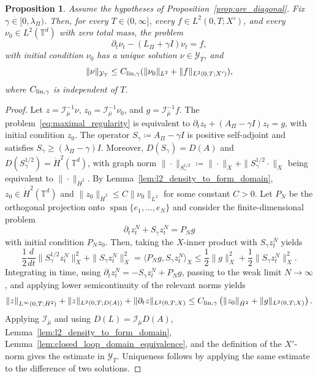 \documentclass[11pt]{article}
\numberwithin{equation}{section}
\newtheorem{proposition}[theorem]{Proposition}
\theoremstyle{definition}
\newcommand{\T}{\mathbb{T}}
\newcommand{\rieszmap}[1][\mu]{\mathcal{I}_{#1}}
\newcommand{\dotHk}[1][k]{\dot{H}^{#1}}
\begin{document}
\begin{proposition}
\label{prop:weighted_linear_density}
    Assume the hypotheses of Proposition~\ref{prop:are_diagonal}.
    Fix $\gamma \in [0, \lambda_\Pi)$. 
    Then, for every $T \in (0,\infty]$, every $f \in L^2(0,T; X')$, and every $\nu_0 \in L^2(\T^d)$ with zero total mass, the problem 
    \begin{equation}
        \label{eq:maximal_regularity}
        \partial_t \nu_t - (L_\Pi + \gamma I)\nu_t = f,
    \end{equation}
    with initial condition $\nu_0$ has a unique solution $\nu \in \mathcal{Y}_T$, and
    \[
    \|\nu\|_{\mathcal{Y}_T} \le C_{\rm lin,\gamma} (\|\nu_0\|_{L^2} + \|f\|_{L^2(0,T;X')}),
    \]
    where $C_{\rm lin, \gamma}$ is independent of $T$.
\end{proposition}

\begin{proof}
    Let $z = \rieszmap[\bar\mu]^{-1}\nu$, $z_0 = \rieszmap[\bar\mu]^{-1}\nu_0$, and $g = \rieszmap[\bar\mu]^{-1}f$. 
    The problem~\eqref{eq:maximal_regularity} is equivalent to $\partial_t z_t + (A_\Pi - \gamma I) z_t = g$, with initial condition $z_0$.
    The operator $S_\gamma \coloneqq A_\Pi - \gamma I$ is positive self-adjoint and satisfies $S_\gamma \ge (\lambda_\Pi - \gamma)I$.
    Moreover, $D(S_\gamma) = D(A)$ and $D(S_\gamma^{1/2}) = \dotHk[2](\T^d)$, with graph norm $\|\cdot\|_{S_\gamma^{1/2}} \coloneqq \|\cdot\|_X + \|S_\gamma^{1/2} \cdot\|_X$ being equivalent to $\|\cdot\|_{\dotHk[2]}$.
    By Lemma~\ref{lem:l2_density_to_form_domain}, $z_0 \in \dotHk[2](\T^d)$ and $\|z_0\|_{\dotHk[2]} \le C\|\nu_0\|_{L^2}$ for some constant $C > 0$.
    Let $P_N$ be the orthogonal projection onto $\operatorname{span}\{e_1,\dots,e_N\}$ and consider the finite-dimensional problem
    \[
    \partial_t z^N_t + S_\gamma z_t^N = P_N g
    \]
    with initial condition $P_N z_0$.
    Then, taking the $X$-inner product with $S_\gamma z_t^N$ yields
    \[
    \frac{1}{2}\frac{d}{dt} \|S_\gamma^{1/2}z_t^N\|_X^2 + \|S_\gamma z_t^N\|_X^2 = \langle P_N g, S_\gamma z_t^N\rangle_X \le \frac{1}{2} \|g\|_X^2 + \frac{1}{2}\|S_\gamma z_t^N\|_X^2.
    \]
    Integrating in time, using $\partial_t z_t^N = -S_\gamma z_t^N + P_N g$, passing to the weak limit $N \to \infty$, and applying lower semicontinuity of the relevant norms yields 
    \[
    \|z\|_{L^\infty(0,T; \dotHk[2])} + \|z\|_{L^2(0,T; D(A))} + \|\partial_t z\|_{L^2(0,T; X)} \le C_{\rm lin, \gamma}\left(\|z_0\|_{\dotHk[2]} + \|g\|_{L^2(0,T; X)} \right).
    \]
    Applying $\rieszmap[\bar\mu]$ and using $D(L)=\rieszmap[\bar\mu]D(A)$, Lemma~\ref{lem:l2_density_to_form_domain}, Lemma~\ref{lem:closed_loop_domain_equivalence}, and the definition of the $X'$-norm gives the estimate in $\mathcal{Y}_T$. 
    Uniqueness follows by applying the same estimate to the difference of two solutions.
\end{proof}
\end{document}
